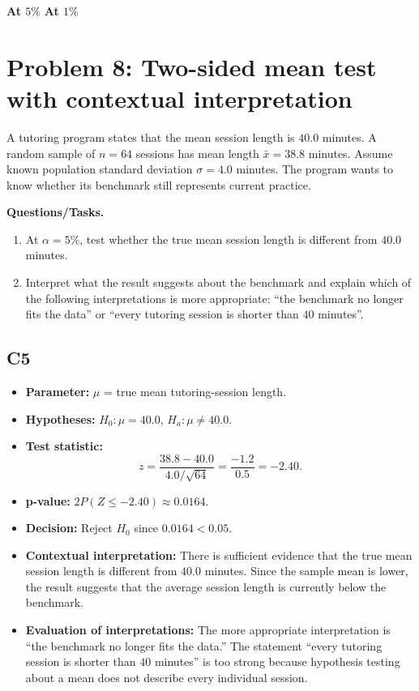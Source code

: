 	\begin{center}
		\textbf{At \(5\%\)}\;
		\hspace{0.8cm}
		\textbf{At \(1\%\)}\;
	\end{center}
	
	\section{Problem 8: Two-sided mean test with contextual interpretation}
	A tutoring program states that the mean session length is \(40.0\) minutes. A random sample of \(n=64\) sessions has mean length \(\bar x=38.8\) minutes. Assume known population standard deviation \(\sigma=4.0\) minutes. The program wants to know whether its benchmark still represents current practice.
	
	\textbf{Questions/Tasks.}
	\begin{enumerate}
		\item[(a)] At \(\alpha=5\%\), test whether the true mean session length is different from \(40.0\) minutes.
		\item[(b)] Interpret what the result suggests about the benchmark and explain which of the following interpretations is more appropriate: ``the benchmark no longer fits the data'' or ``every tutoring session is shorter than \(40\) minutes''.
	\end{enumerate}
	
	\subsection*{C5}
	\begin{itemize}
		\item \textbf{Parameter:} \(\mu\) = true mean tutoring-session length.
		\item \textbf{Hypotheses:} \(H_0:\mu=40.0\), \(H_a:\mu\ne40.0\).
		\item \textbf{Test statistic:}
		\[
		z=\frac{38.8-40.0}{4.0/\sqrt{64}}=\frac{-1.2}{0.5}=-2.40.
		\]
		\item \textbf{p-value:} \(2P(Z\le-2.40)\approx0.0164\).
		\item \textbf{Decision:} Reject \(H_0\) since \(0.0164<0.05\).
		\item \textbf{Contextual interpretation:} There is sufficient evidence that the true mean session length is different from \(40.0\) minutes. Since the sample mean is lower, the result suggests that the average session length is currently below the benchmark.
		\item \textbf{Evaluation of interpretations:} The more appropriate interpretation is ``the benchmark no longer fits the data.'' The statement ``every tutoring session is shorter than \(40\) minutes'' is too strong because hypothesis testing about a mean does not describe every individual session.
	\end{itemize}
	
	\begin{center}
	\end{center}
	
